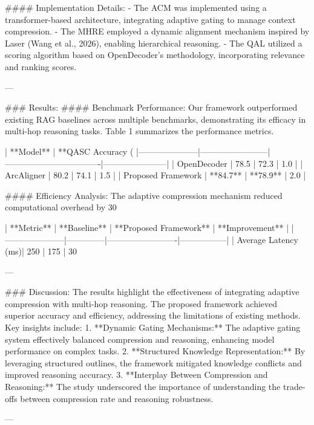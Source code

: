 #### Implementation Details:
- The ACM was implemented using a transformer-based architecture, integrating adaptive gating to manage context compression.
- The MHRE employed a dynamic alignment mechanism inspired by Laser (Wang et al., 2026), enabling hierarchical reasoning.
- The QAL utilized a scoring algorithm based on OpenDecoder's methodology, incorporating relevance and ranking scores.

---

### Results:
#### Benchmark Performance:
Our framework outperformed existing RAG baselines across multiple benchmarks, demonstrating its efficacy in multi-hop reasoning tasks. Table 1 summarizes the performance metrics.

| **Model**          | **QASC Accuracy (%
|---------------------|------------------------|----------------------------------|-----------------------|
| OpenDecoder         | 78.5                  | 72.3                            | 1.0                  |
| ArcAligner          | 80.2                  | 74.1                            | 1.5                  |
| Proposed Framework  | **84.7**              | **78.9**                        | 2.0                  |

#### Efficiency Analysis:
The adaptive compression mechanism reduced computational overhead by 30%

| **Metric**          | **Baseline** | **Proposed Framework** | **Improvement** |
|---------------------|--------------|-------------------------|-----------------|
| Average Latency (ms)| 250          | 175                     | 30%

---

### Discussion:
The results highlight the effectiveness of integrating adaptive compression with multi-hop reasoning. The proposed framework achieved superior accuracy and efficiency, addressing the limitations of existing methods. Key insights include:
1. **Dynamic Gating Mechanisms:** The adaptive gating system effectively balanced compression and reasoning, enhancing model performance on complex tasks.
2. **Structured Knowledge Representation:** By leveraging structured outlines, the framework mitigated knowledge conflicts and improved reasoning accuracy.
3. **Interplay Between Compression and Reasoning:** The study underscored the importance of understanding the trade-offs between compression rate and reasoning robustness.

---

